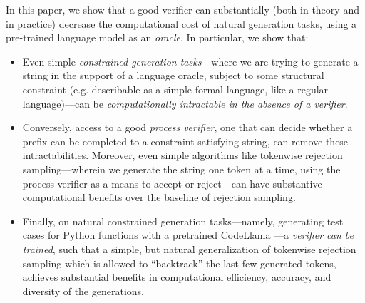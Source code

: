 In this paper, we show that a good verifier can substantially (both in theory and in practice) decrease the computational cost of natural generation tasks, using a pre-trained language model as an \emph{oracle}. In particular, we show that: 
\begin{itemize}
    \item Even simple \emph{constrained generation tasks}---where we are trying to generate a string in the support of a language oracle, subject to some structural constraint (e.g. describable as a simple formal language, like a regular language)---can be \emph{computationally intractable in the absence of a verifier}. 
    \item Conversely, access to a good \emph{process verifier}, one that can decide whether a prefix can be completed to a constraint-satisfying string, can remove these intractabilities. Moreover, even simple algorithms like tokenwise rejection sampling---wherein we generate the string one token at a time, using the process verifier as a means to accept or reject---can have substantive computational benefits over the baseline of rejection sampling. 
    \item Finally, on natural constrained generation tasks---namely, generating test cases for Python functions with a pretrained CodeLlama \citep{roziere2023code}---a \emph{verifier can be trained}, such that a simple, but natural generalization of tokenwise rejection sampling which is allowed to ``backtrack'' the last few generated tokens, achieves substantial benefits in computational efficiency, accuracy, and diversity of the generations.
\end{itemize}

